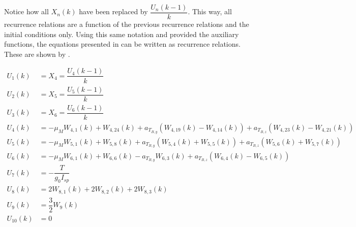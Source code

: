 Notice how all $X_{n}\left(k\right)$ have been replaced by $\dfrac{U_{n}\left(k-1\right)}{k}$. This way, all recurrence relations are a function of the previous recurrence relations and the initial conditions only. Using this same notation and provided the auxiliary functions, the equations presented in  can be written as recurrence relations. These are shown by .

\begin{equation} \label{eq:allRecRel1}
\begin{split}
U_{1}\left(k\right)&=X_{4}=\dfrac{U_{4}\left(k-1\right)}{k}\\
U_{2}\left(k\right)&=X_{5}=\dfrac{U_{5}\left(k-1\right)}{k}\\
U_{3}\left(k\right)&=X_{6}=\dfrac{U_{6}\left(k-1\right)}{k} \\
U_{4}\left(k\right)&=-\mu_{M}W_{4,1}\left(k\right)+W_{4,24}\left(k\right)+a_{T_{B,y}}\left(W_{4,19}\left(k\right)-W_{4,14}\left(k\right)\right)+a_{T_{B,z}}\left(W_{4,23}\left(k\right)-W_{4,21}\left(k\right)\right)\\
U_{5}\left(k\right)&=-\mu_{M}W_{5,1}\left(k\right)+W_{5,8}\left(k\right)+a_{T_{B,y}}\left(W_{5,4}\left(k\right)+W_{5,5}\left(k\right)\right)+a_{T_{B,z}}\left(W_{5,6}\left(k\right)+W_{5,7}\left(k\right)\right)\\
U_{6}\left(k\right)&=-\mu_{M}W_{6,1}\left(k\right)+W_{6,6}\left(k\right)-a_{T_{B,y}}W_{6,3}\left(k\right)+a_{T_{B,z}}\left(W_{6,4}\left(k\right)-W_{6,5}\left(k\right)\right)\\
U_{7} \left(k\right)&=-\dfrac{T}{g_{0}I_{sp}}\\
U_{8}\left(k\right)&=2W_{8,1}\left(k\right)+2W_{8,2}\left(k\right)+2W_{8,3}\left(k\right)\\
U_{9}\left(k\right)&=\dfrac{3}{2}W_{9}\left(k\right)\\
U_{10} \left(k\right)&= 0 \\
\end{split}
\end{equation}




